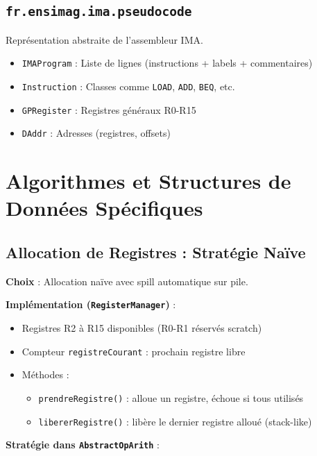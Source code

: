 \documentclass[12pt,a4paper]{article}
\begin{document}
\subsection{\texttt{fr.ensimag.ima.pseudocode}}

Représentation abstraite de l'assembleur IMA.

\begin{itemize}[itemsep=0.2em]
    \item \texttt{IMAProgram} : Liste de lignes (instructions + labels + commentaires)
    \item \texttt{Instruction} : Classes comme \texttt{LOAD}, \texttt{ADD}, \texttt{BEQ}, etc.
    \item \texttt{GPRegister} : Registres généraux R0-R15
    \item \texttt{DAddr} : Adresses (registres, offsets)
\end{itemize}

\section{Algorithmes et Structures de Données Spécifiques}

\subsection{Allocation de Registres : Stratégie Naïve}

\textbf{Choix} : Allocation naïve avec spill automatique sur pile.

\textbf{Implémentation (\texttt{RegisterManager})} :

\begin{itemize}[itemsep=0.2em]
    \item Registres R2 à R15 disponibles (R0-R1 réservés scratch)
    \item Compteur \texttt{registreCourant} : prochain registre libre
    \item Méthodes :
    \begin{itemize}
        \item \texttt{prendreRegistre()} : alloue un registre, échoue si tous utilisés
        \item \texttt{libererRegistre()} : libère le dernier registre alloué (stack-like)
    \end{itemize}
\end{itemize}

\textbf{Stratégie dans \texttt{AbstractOpArith}} :
\end{document}
